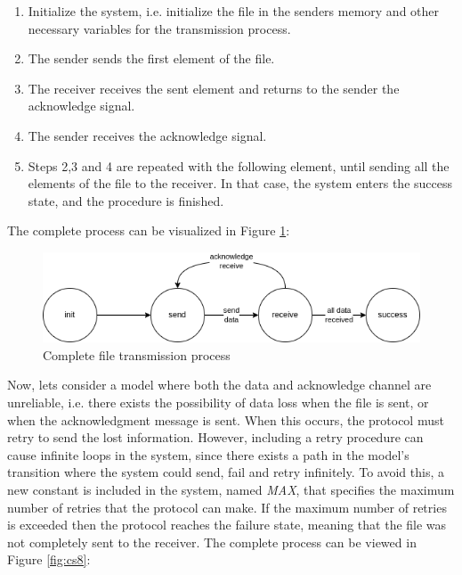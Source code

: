 \begin{enumerate}
    \item Initialize the system, i.e. initialize the file in the senders memory and other necessary variables for the transmission process.
    \item The sender sends the first element of the file.
    \item The receiver receives the sent element and returns to the sender the acknowledge signal.
    \item The sender receives the acknowledge signal.
    \item Steps 2,3 and 4 are repeated with the following element, until sending all the elements of the file to the receiver. In that case, the system enters the success state, and the procedure is finished.
\end{enumerate}
The complete process can be visualized in Figure \ref{fig:cs7}:
\begin{figure}[H]
    \centering
    \includegraphics[scale = 0.7]{images/CS7.png}
    \caption{Complete file transmission process}
    \label{fig:cs7}
\end{figure}
Now, lets consider a model where both the data and acknowledge channel are unreliable, i.e. there exists the possibility of data loss when the file is sent, or when the acknowledgment message is sent. When this occurs, the protocol must retry to send the lost information. However, including a retry procedure can cause infinite loops in the system, since there exists a path in the model's transition where the system could send, fail and retry infinitely. To avoid this, a new constant is included in the system, named \textit{MAX}, that specifies the maximum number of retries that the protocol can make. If the maximum number of retries is exceeded then the protocol reaches the failure state, meaning that the file was not completely sent to the receiver. The complete process can be viewed in Figure \ref{fig:cs8}:     
